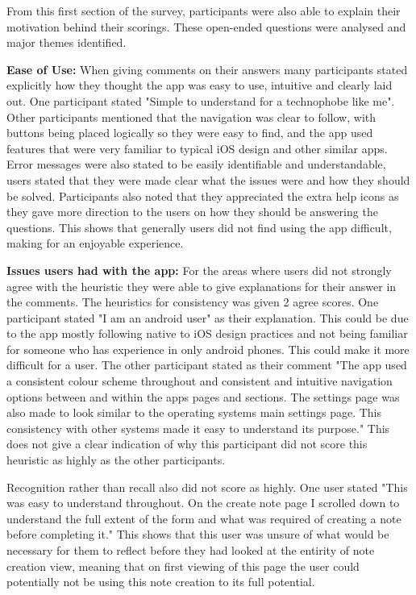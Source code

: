 \documentclass{l4proj}
\begin{document}
From this first section of the survey, participants were also able to explain their motivation behind their scorings. These open-ended questions were analysed and major themes identified.

\textbf{Ease of Use:} When giving comments on their answers many participants stated explicitly how they thought the app was easy to use, intuitive and clearly laid out. One participant stated "Simple to understand for a technophobe like me". Other participants mentioned that the navigation was clear to follow, with buttons being placed logically so they were easy to find, and the app used features that were very familiar to typical iOS design and other similar apps. Error messages were also stated to be easily identifiable and understandable, users stated that they were made clear what the issues were and how they should be solved. Participants also noted that they appreciated the extra help icons as they gave more direction to the users on how they should be answering the questions. This shows that generally users did not find using the app difficult, making for an enjoyable experience.

\textbf{Issues users had with the app:} For the areas where users did not strongly agree with the heuristic they were able to give explanations for their answer in the comments. The heuristics for consistency was given 2 agree scores. One participant stated "I am an android user" as their explanation. This could be due to the app mostly following native to iOS design practices and not being familiar for someone who has experience in only android phones. This could make it more difficult for a user. The other participant stated as their comment "The app used a consistent colour scheme throughout and consistent and intuitive navigation options between and within the apps pages and sections. The settings page was also made to look similar to the operating systems main settings page. This consistency with other systems made it easy to understand its purpose." This does not give a clear indication of why this participant did not score this heuristic as highly as the other participants.

Recognition rather than recall also did not score as highly. One user stated "This was easy to understand throughout. On the create note page I scrolled down to understand the full extent of the form and what was required of creating a note before completing it." This shows that this user was unsure of what would be necessary for them to reflect before they had looked at the entirity of note creation view, meaning that on first viewing of this page the user could potentially not be using this note creation to its full potential. 
\end{document}
